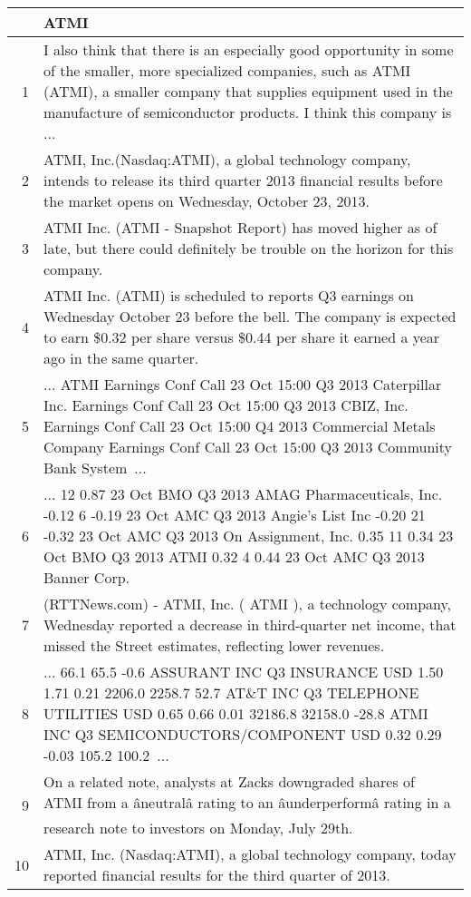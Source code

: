 \documentclass{tufte-handout}\usepackage[]{graphicx}\usepackage[]{color}
\begin{document}
\begin{tabularx}{\textwidth}{rX}
  \hline
 & ATMI \\ 
  \hline
1 &  I also think that there is an especially good opportunity in some of the smaller, more specialized companies, such as ATMI (ATMI), a smaller company that supplies equipment used in the manufacture of semiconductor products. I think this company is ...  \\ 
  2 &  ATMI, Inc.(Nasdaq:ATMI), a global technology company, intends to release its third quarter 2013 financial results before the market opens on Wednesday, October 23, 2013.  \\ 
  3 &  ATMI Inc. (ATMI - Snapshot Report) has moved higher as of late, but there could definitely be trouble on the horizon for this company.  \\ 
  4 &  ATMI Inc. (ATMI) is scheduled to reports Q3 earnings on Wednesday October 23 before the bell. The company is expected to earn \$0.32 per share versus \$0.44 per share it earned a year ago in the same quarter.  \\ 
  5 &  ... ATMI Earnings Conf Call 23 Oct 15:00 Q3 2013 Caterpillar Inc. Earnings Conf Call 23 Oct 15:00 Q3 2013 CBIZ, Inc. Earnings Conf Call 23 Oct 15:00 Q4 2013 Commercial Metals Company Earnings Conf Call 23 Oct 15:00 Q3 2013 Community Bank System ...  \\ 
  6 &  ... 12 0.87 23 Oct BMO Q3 2013 AMAG Pharmaceuticals, Inc. -0.12 6 -0.19 23 Oct AMC Q3 2013 Angie's List Inc -0.20 21 -0.32 23 Oct AMC Q3 2013 On Assignment, Inc. 0.35 11 0.34 23 Oct BMO Q3 2013 ATMI 0.32 4 0.44 23 Oct AMC Q3 2013 Banner Corp.  \\ 
  7 &  (RTTNews.com) - ATMI, Inc. ( ATMI ), a technology company, Wednesday reported a decrease in third-quarter net income, that missed the Street estimates, reflecting lower revenues.  \\ 
  8 &  ... 66.1 65.5 -0.6 ASSURANT INC Q3 INSURANCE USD 1.50 1.71 0.21 2206.0 2258.7 52.7 AT\&T INC Q3 TELEPHONE UTILITIES USD 0.65 0.66 0.01 32186.8 32158.0 -28.8 ATMI INC Q3 SEMICONDUCTORS/COMPONENT USD 0.32 0.29 -0.03 105.2 100.2 ...  \\ 
  9 &  On a related note, analysts at Zacks downgraded shares of ATMI from a âneutralâ rating to an âunderperformâ rating in a research note to investors on Monday, July 29th.  \\ 
  10 &  ATMI, Inc. (Nasdaq:ATMI), a global technology company, today reported financial results for the third quarter of 2013.  \\ 
   \hline
\end{tabularx}
\end{document}
